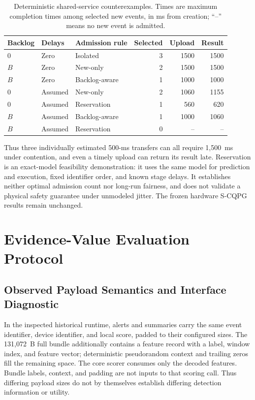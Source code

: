 \documentclass[10pt,onecolumn]{IEEEtran}
\begin{document}
\begin{table}[H]
\centering
\caption{Deterministic shared-service counterexamples. Times are maximum
completion times among selected new events, in ms from creation; ``--''
means no new event is admitted.}
\label{tab:contention_counterexamples}
\small
\begin{tabular}{@{}lllr rr@{}}
\toprule
Backlog & Delays & Admission rule & Selected & Upload & Result \\
\midrule
0 & Zero & Isolated & 3 & 1500 & 1500 \\
$B$ & Zero & New-only & 2 & 1500 & 1500 \\
$B$ & Zero & Backlog-aware & 1 & 1000 & 1000 \\
0 & Assumed & New-only & 2 & 1060 & 1155 \\
0 & Assumed & Reservation & 1 & 560 & 620 \\
$B$ & Assumed & Backlog-aware & 1 & 1000 & 1060 \\
$B$ & Assumed & Reservation & 0 & -- & -- \\
\bottomrule
\end{tabular}
\end{table}

Thus three individually estimated 500-ms transfers can all require 1,500~ms
under contention, and even a timely upload can return its result late.
Reservation is an exact-model feasibility demonstration: it uses the same
model for prediction and execution, fixed identifier order, and known stage
delays. It establishes neither optimal admission count nor long-run fairness,
and does not validate a physical safety guarantee under unmodeled jitter.
The frozen hardware S-CQPG results remain unchanged.

\section{Evidence-Value Evaluation Protocol}
\label{sec:evidence_value_protocol}
\subsection{Observed Payload Semantics and Interface Diagnostic}
In the inspected historical runtime, alerts and summaries carry the same
event identifier, device identifier, and local score, padded to their
configured sizes. The 131,072~B full bundle additionally contains a feature
record with a label, window index, and feature vector; deterministic
pseudorandom context and trailing zeros fill the remaining space. The core
scorer consumes only the decoded features. Bundle labels, context, and
padding are not inputs to that scoring call. Thus differing payload sizes do
not by themselves establish differing detection information or utility.
\end{document}
